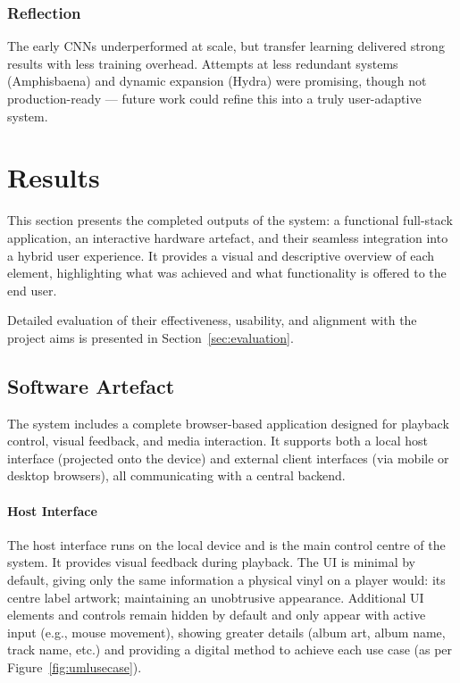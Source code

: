             \subsubsection*{Reflection}
                The early CNNs underperformed at scale, but transfer learning delivered strong results with less training overhead. Attempts at less redundant systems (Amphisbaena) and dynamic expansion (Hydra) were promising, though not production-ready — future work could refine this into a truly user-adaptive system.
    
    \section{Results} %
    
        This section presents the completed outputs of the system: a functional full-stack application, an interactive hardware artefact, and their seamless integration into a hybrid user experience. It provides a visual and descriptive overview of each element, highlighting what was achieved and what functionality is offered to the end user.
        
        Detailed evaluation of their effectiveness, usability, and alignment with the project aims is presented in Section~\ref{sec:evaluation}.
        
        \subsection{Software Artefact}
    
            The system includes a complete browser-based application designed for playback control, visual feedback, and media interaction. It supports both a local host interface (projected onto the device) and external client interfaces (via mobile or desktop browsers), all communicating with a central backend.
    
            \paragraph{Host Interface}
    
            The host interface runs on the local device and is the main control centre of the system. It provides visual feedback during playback. The UI is minimal by default, giving only the same information a physical vinyl on a player would: its centre label artwork; maintaining an unobtrusive appearance. Additional UI elements and controls remain hidden by default and only appear with active input (e.g., mouse movement), showing greater details (album art, album name, track name, etc.) and providing a digital method to achieve each use case (as per Figure~\ref{fig:umlusecase}).
    
